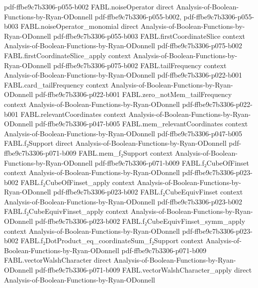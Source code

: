 \begin{theorem}
  {pdf-ffbe9c7b3306-p055-b002}
\proofstep
  {FABL.noiseOperator}
  {direct}
  {Analysis-of-Boolean-Functions-by-Ryan-ODonnell}
  {pdf-ffbe9c7b3306-p055-b002,
    pdf-ffbe9c7b3306-p055-b003}
\proofstep
  {FABL.noiseOperator_monomial}
  {direct}
  {Analysis-of-Boolean-Functions-by-Ryan-ODonnell}
  {pdf-ffbe9c7b3306-p055-b003}
\proofstep
  {FABL.firstCoordinateSlice}
  {context}
  {Analysis-of-Boolean-Functions-by-Ryan-ODonnell}
  {pdf-ffbe9c7b3306-p075-b002}
\proofstep
  {FABL.firstCoordinateSlice_apply}
  {context}
  {Analysis-of-Boolean-Functions-by-Ryan-ODonnell}
  {pdf-ffbe9c7b3306-p075-b002}
\proofstep
  {FABL.tailFrequency}
  {context}
  {Analysis-of-Boolean-Functions-by-Ryan-ODonnell}
  {pdf-ffbe9c7b3306-p022-b001}
\proofstep
  {FABL.card_tailFrequency}
  {context}
  {Analysis-of-Boolean-Functions-by-Ryan-ODonnell}
  {pdf-ffbe9c7b3306-p022-b001}
\proofstep
  {FABL.zero_notMem_tailFrequency}
  {context}
  {Analysis-of-Boolean-Functions-by-Ryan-ODonnell}
  {pdf-ffbe9c7b3306-p022-b001}
\proofstep
  {FABL.relevantCoordinates}
  {context}
  {Analysis-of-Boolean-Functions-by-Ryan-ODonnell}
  {pdf-ffbe9c7b3306-p047-b005}
\proofstep
  {FABL.mem_relevantCoordinates}
  {context}
  {Analysis-of-Boolean-Functions-by-Ryan-ODonnell}
  {pdf-ffbe9c7b3306-p047-b005}
\proofstep
  {FABL.f₂Support}
  {direct}
  {Analysis-of-Boolean-Functions-by-Ryan-ODonnell}
  {pdf-ffbe9c7b3306-p071-b009}
\proofstep
  {FABL.mem_f₂Support}
  {context}
  {Analysis-of-Boolean-Functions-by-Ryan-ODonnell}
  {pdf-ffbe9c7b3306-p071-b009}
\proofstep
  {FABL.f₂CubeOfFinset}
  {context}
  {Analysis-of-Boolean-Functions-by-Ryan-ODonnell}
  {pdf-ffbe9c7b3306-p023-b002}
\proofstep
  {FABL.f₂CubeOfFinset_apply}
  {context}
  {Analysis-of-Boolean-Functions-by-Ryan-ODonnell}
  {pdf-ffbe9c7b3306-p023-b002}
\proofstep
  {FABL.f₂CubeEquivFinset}
  {context}
  {Analysis-of-Boolean-Functions-by-Ryan-ODonnell}
  {pdf-ffbe9c7b3306-p023-b002}
\proofstep
  {FABL.f₂CubeEquivFinset_apply}
  {context}
  {Analysis-of-Boolean-Functions-by-Ryan-ODonnell}
  {pdf-ffbe9c7b3306-p023-b002}
\proofstep
  {FABL.f₂CubeEquivFinset_symm_apply}
  {context}
  {Analysis-of-Boolean-Functions-by-Ryan-ODonnell}
  {pdf-ffbe9c7b3306-p023-b002}
\proofstep
  {FABL.f₂DotProduct_eq_coordinateSum_f₂Support}
  {context}
  {Analysis-of-Boolean-Functions-by-Ryan-ODonnell}
  {pdf-ffbe9c7b3306-p071-b009}
\proofstep
  {FABL.vectorWalshCharacter}
  {direct}
  {Analysis-of-Boolean-Functions-by-Ryan-ODonnell}
  {pdf-ffbe9c7b3306-p071-b009}
\proofstep
  {FABL.vectorWalshCharacter_apply}
  {direct}
  {Analysis-of-Boolean-Functions-by-Ryan-ODonnell}

\end{theorem}
